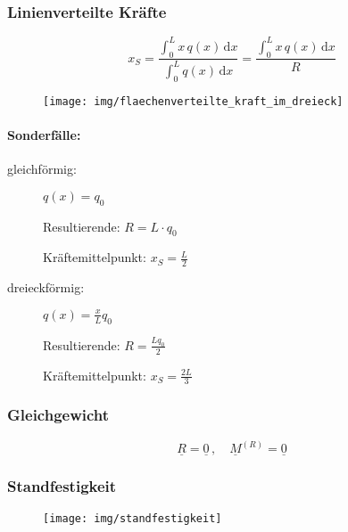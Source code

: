 \documentclass{article}
\newcommand{\ud}{\,\mathrm{d}}
\begin{document}
\begin{multicols*}{4}
				\subsubsection{Linienverteilte Kräfte} %
					\[
						x_S = \frac{\int_0^L x\, q(x) \ud x}{\int_0^L q(x) \ud x}
						= \frac{\int_0^L x\, q(x) \ud x}{R}
					\]
					
					\begin{wrapfigure}{r}{2cm}
						\vspace{1.25cm}
						\texttt{[image: img/flaechenverteilte\_kraft\_im\_dreieck]}
						\vspace{-5cm}
					\end{wrapfigure}
					\paragraph{Sonderfälle:} %
						\begin{description}
							\item[gleichförmig:]
								$q(x) = q_0$
								
								Resultierende: $R = L \cdot q_0$
								
								Kräftemittelpunkt: $x_S = \frac{L}{2}$
							\item[dreieckförmig:]
								
								$q(x) = \frac{x}{L}q_0$
								
								Resultierende: $R = \frac{L q_0}{2}$
								
								Kräftemittelpunkt: $x_S = \frac{2L}{3}$
						\end{description}
				\subsubsection{Gleichgewicht} %
					\[
						\underline{R} = \underline{0} \, , \quad \underline{M}^{(R)} = \underline{0}
					\]
				\subsubsection{Standfestigkeit} %

					\begin{wrapfigure}{l}{2.5cm}
						\vspace{-.75cm}
						\texttt{[image: img/standfestigkeit]}
						\vspace{-2.5cm}
					\end{wrapfigure}
				

\end{multicols*}
\end{document}
